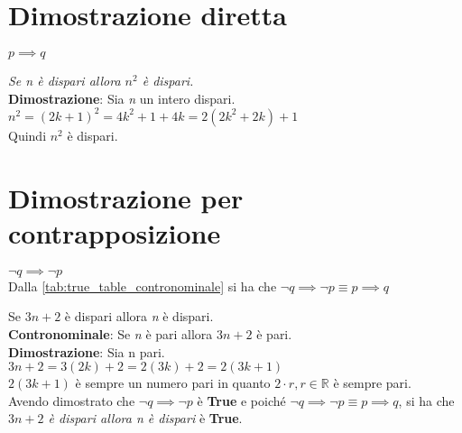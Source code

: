 \section{Dimostrazione diretta}
$p \implies q$
\begin{example}
\emph{Se \textit{n} è dispari allora $n^2$ è dispari.} \\
\textbf{Dimostrazione}: Sia \textit{n} un intero dispari. \\
$n^2=(2k+1)^2=4k^2+1+4k=2(2k^2+2k)+1$ \\
Quindi $n^2$ è dispari.
\end{example}

\section{Dimostrazione per contrapposizione}
\label{sec:dimostrazione_contrapposizione}

$\neg q \implies \neg p$ \\
Dalla \autoref{tab:true_table_contronominale} si ha che $\neg q \implies \neg p \equiv p \implies q$
\begin{example}
Se $3n+2$ è dispari allora \textit{n} è dispari. \\
\textbf{Contronominale}: Se \textit{n} è pari allora $3n+2$ è pari. \\
\textbf{Dimostrazione}: Sia n pari. \\
$3n+2=3(2k)+2=2(3k)+2=2(3k+1)$ \\
$2(3k+1)$ è sempre un numero pari in quanto $2 \cdot r, r \in \mathbb{R}$ è sempre pari. \\
Avendo dimostrato che $\neg q \implies \neg p$ è \textbf{True} e poiché $\neg q \implies \neg p \equiv p \implies q$, si ha che \emph{$3n+2$ è dispari allora \textit{n} è dispari} è \textbf{True}.
\end{example}

